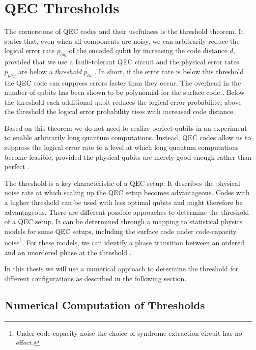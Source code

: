 \chapter{QEC Thresholds}\label{chapter:qec_thresholds}

The cornerstone of QEC codes and their usefulness is the threshold theorem. 
It states that, even when all components are noisy,
we can arbitrarily reduce the logical error rate $p_{log}$ of the encoded qubit by increasing the code distance $d$,
provided that we use a fault-tolerant QEC circuit and the physical error rates $p_{phy}$ are below a \emph{threshold} $p_{th}$ \cite{gottesmann_book,topological_quantum_memory}.
In short, if the error rate is below this threshold the QEC code can suppress errors faster than they occur.
The overhead in the number of qubits has been shown to be polynomial for the surface code \cite{topological_quantum_memory}.
Below the threshold each additional qubit reduces the logical error probability;
above the threshold the logical error probability rises with increased code distance.

Based on this theorem we do not need to realize perfect qubits in an experiment to enable arbitrarily long quantum computations.
Instead, QEC codes allow us to suppress the logical error rate to a level at which long quantum computations become feasible, 
provided the physical qubits are merely good enough rather than perfect \cite{gottesmann_book}. 

The threshold is a key characteristic of a QEC setup.
It describes the physical noise rate at which scaling up the QEC setup becomes advantageous.
Codes with a higher threshold can be used with less optimal qubits and might therefore be advantageous.
There are different possible approaches to determine the threshold of a QEC setup.
It can be determined through a mapping to statistical physics models for some QEC setups, 
including the surface code under code-capacity noise\footnote{
    Under code-capacity noise the choice of syndrome extraction circuit has no effect.
    }.
For these models, we can identify a phase transition between an ordered and an unordered phase at the threshold \cite{fundamental_thresholds,topological_quantum_memory}.

In this thesis we will use a numerical approach to determine the threshold for different configurations as described in the following section.

\section{Numerical Computation of Thresholds}

